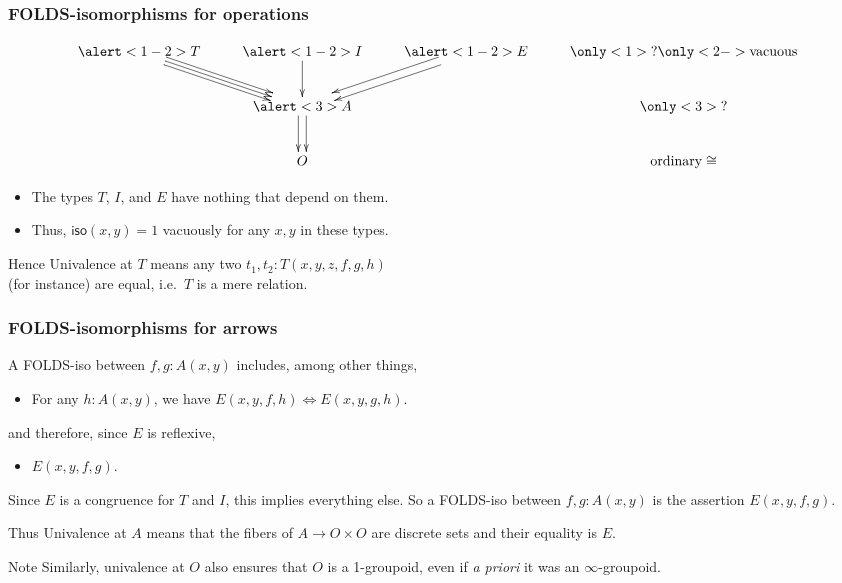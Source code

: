 \documentclass{beamer}
\begin{document}
\begin{frame}
  \frametitle{FOLDS-isomorphisms for operations}
  \[
  \vcenter{\xymatrix{
      \alert<1-2>{T} \ar[dr] \ar@<1mm>[dr] \ar@<-1mm>[dr] & \alert<1-2>{I} \ar[d] & \alert<1-2>{E} \ar@<1mm>[dl] \ar@<-1mm>[dl] &
      \only<1>{?}\only<2->{\text{vacuous}}\\
      & \alert<3>{A} \ar@<1mm>[d] \ar@<-1mm>[d] && \only<3>{?} \\
      & {O}&& \text{ordinary} \cong}}
  \]
  \pause
  \begin{itemize}
  \item The types $T$, $I$, and $E$ have \alert<2>{nothing} that depend on them.
  \item Thus, $\mathsf{iso}(x,y)=1$ vacuously for any $x,y$ in these types.
  \end{itemize}
  \begin{block}{Hence}
    Univalence at $T$ means any two $t_1,t_2 : T(x,y,z,f,g,h)$\\ (for instance) are equal, i.e.\ $T$ is a mere relation.
  \end{block}
\end{frame}

\begin{frame}
  \frametitle{FOLDS-isomorphisms for arrows}
  A FOLDS-iso between $f,g:A(x,y)$ includes, among other things,
  \begin{itemize}
  \item For any $h:A(x,y)$, we have $E(x,y,f,h) \iff E(x,y,g,h)$.
  \end{itemize}
  and therefore, since $E$ is reflexive,
  \begin{itemize}
  \item $E(x,y,f,g)$.
  \end{itemize}
  \pause
  Since $E$ is a congruence for $T$ and $I$, this implies everything else.
  So \alert{a FOLDS-iso between $f,g:A(x,y)$ is the assertion $E(x,y,f,g)$.}
  \begin{block}{Thus}
    Univalence at $A$ means that the fibers of $A\to O\times O$ are discrete sets and their equality is $E$.
  \end{block}
  \pause
  \begin{block}{Note}
    Similarly, univalence at $O$ also ensures that $O$ is a 1-groupoid, even if \textit{a priori} it was an $\infty$-groupoid.
  \end{block}
\end{frame}
\end{document}
